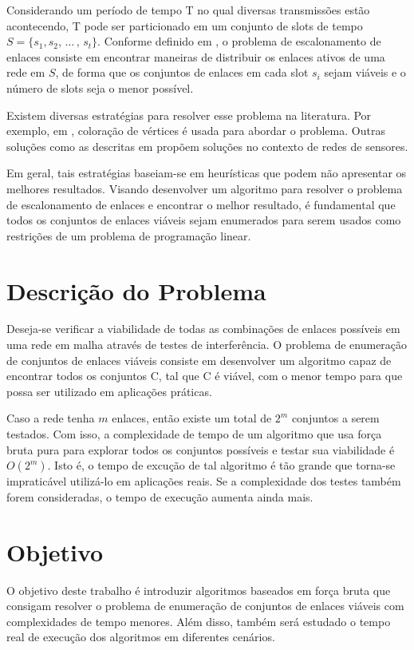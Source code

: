 Considerando um período de tempo T no qual diversas transmissões estão acontecendo, T pode ser particionado em um conjunto de slots de tempo $S=\{s_1, s_2, \, \ldots \, , \, s_t\}$. Conforme definido em \cite{scheduling}, o problema de escalonamento de enlaces consiste em encontrar maneiras de distribuir os enlaces ativos de uma rede em $S$, de forma que os conjuntos de enlaces em cada slot $s_i$ sejam viáveis e o número de slots seja o menor possível.

Existem diversas estratégias para resolver esse problema na literatura. Por exemplo, em \cite{scheduling}, coloração de vértices é usada para abordar o problema. Outras soluções como as descritas em \cite{dist-sched, coloring} propõem soluções no contexto de redes de sensores.

Em geral, tais estratégias baseiam-se em heurísticas que podem não apresentar os melhores resultados. Visando desenvolver um algoritmo para resolver o problema de escalonamento de enlaces e encontrar o melhor resultado, é fundamental que todos os conjuntos de enlaces viáveis sejam enumerados para serem usados como restrições de um problema de programação linear.

\section{Descrição do Problema}

Deseja-se verificar a viabilidade de todas as combinações de enlaces possíveis em uma rede em malha através de testes de interferência. O problema de enumeração de conjuntos de enlaces viáveis consiste em desenvolver um algoritmo capaz de encontrar todos os conjuntos C, tal que C é viável, com o menor tempo para que possa ser utilizado em aplicações práticas.

Caso a rede tenha $m$ enlaces, então existe um total de $2^m$ conjuntos a serem testados. Com isso, a complexidade de tempo de um algoritmo que usa força bruta pura para explorar todos os conjuntos possíveis e testar sua viabilidade é $O(2^m)$. Isto é, o tempo de excução de tal algoritmo é tão grande que torna-se impraticável utilizá-lo em aplicações reais. Se a complexidade dos testes também forem consideradas, o tempo de execução aumenta ainda mais. 

\section{Objetivo}

O objetivo deste trabalho é introduzir algoritmos baseados em força bruta que consigam resolver o problema de enumeração de conjuntos de enlaces viáveis com complexidades de tempo menores. Além disso, também será estudado o tempo real de execução dos algoritmos em diferentes cenários.
 
